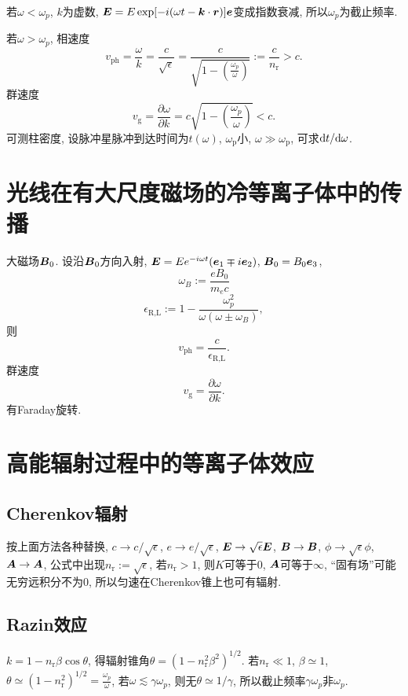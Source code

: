 若$\omega<\omega_p$, $k$为虚数, $\boldsymbol{E}=E\exp[-i(\omega t-\boldsymbol{k}\cdot\boldsymbol{r})]\boldsymbol{e}$变成指数衰减, 所以$\omega_p$为截止频率.

若$\omega>\omega_p$, 相速度
\begin{equation}
    v_\text{ph}=\frac{\omega}{k}=\frac{c}{\sqrt{\epsilon}}=\frac{c}{\sqrt{1-\left(\frac{\omega_p}{\omega}\right)}}:=\frac{c}{n_\text{r}}>c.
\end{equation}
群速度
\begin{equation}
    v_\text{g}=\frac{\partial\omega}{\partial k}=c\sqrt{1-\left(\frac{\omega_p}{\omega}\right)}<c.
\end{equation}
可测柱密度, 设脉冲星脉冲到达时间为$t(\omega)$, $\omega_\text{p}$小, $\omega\gg\omega_\text{p}$, 可求$\mathrm{d} t/\mathrm{d}\omega$.

\section{光线在有大尺度磁场的冷等离子体中的传播}

大磁场$\boldsymbol{B}_0$. 设沿$\boldsymbol{B}_0$方向入射, $\boldsymbol{E}=Ee^{-i\omega t}(\boldsymbol{e}_1\mp i\boldsymbol{e}_2)$, $\boldsymbol{B}_0=B_0\boldsymbol{e}_3$,
\begin{equation}
    \omega_B:=\frac{eB_0}{m_ec}
\end{equation}
\begin{equation}
    \epsilon_\text{R,L}:=1-\frac{\omega_p^2}{\omega(\omega\pm\omega_B)},
\end{equation}
则
\begin{equation}
    v_\text{ph}=\frac{c}{\epsilon_\text{R,L}}.
\end{equation}
群速度
\begin{equation}
    v_\text{g}=\frac{\partial\omega}{\partial k}.
\end{equation}
有Faraday旋转.

\section{高能辐射过程中的等离子体效应}

\subsection{Cherenkov辐射}
按上面方法各种替换, $c\to c/\sqrt{\epsilon}$, $e\to e/\sqrt{\epsilon}$, $\boldsymbol{E}\to \sqrt{\epsilon}\boldsymbol{E}$, $\boldsymbol{B}\to \boldsymbol{B}$, $\phi\to \sqrt{\epsilon}\phi$, $\boldsymbol{A}\to \boldsymbol{A}$, 公式中出现$n_\text{r}:=\sqrt{\epsilon}$, 若$n_\text{r}>1$, 则$K$可等于$0$, $\boldsymbol{A}$可等于$\infty$, ``固有场''可能无穷远积分不为$0$, 所以匀速在Cherenkov锥上也可有辐射.

\subsection{Razin效应}

$k=1-n_\text{r}\beta\cos\theta$, 得辐射锥角$\theta=(1-n_\text{r}^2\beta^2)^{1/2}$. 若$n_\text{r}\ll1$, $\beta\simeq1$, $\theta\simeq(1-n_\text{r}^2)^{1/2}=\frac{\omega_p}{\omega}$, 若$\omega\lesssim\gamma\omega_p$, 则无$\theta\simeq1/\gamma$, 所以截止频率$\gamma\omega_p$非$\omega_p$.
